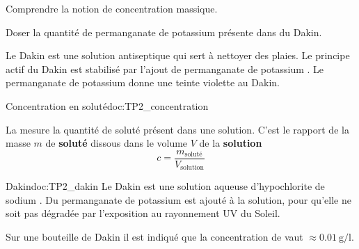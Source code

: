 \teteSndSolu


\vspace*{-36pt}


\begin{objectifs}
  \item Comprendre la notion de concentration massique.
  \item Doser la quantité de permanganate de potassium présente dans du Dakin.
\end{objectifs}


\begin{contexte}
  Le Dakin est une solution antiseptique qui sert à nettoyer des plaies. Le principe actif du Dakin est stabilisé par l'ajout de permanganate de potassium .
  Le permanganate de potassium donne une teinte violette au Dakin.
  
\end{contexte}


\begin{doc}{Concentration en soluté}{doc:TP2_concentration}
  \begin{encart}
    La  mesure la quantité de soluté présent dans une solution.
    C'est le rapport de la masse $m$ de \textbf{soluté} dissous dans le volume $V$ de la \textbf{solution}
    \begin{equation*}
      c = \frac{m_\text{soluté}}{V_\text{solution}}
    \end{equation*}
  \end{encart}
\end{doc}


\begin{doc}{Dakin}{doc:TP2_dakin}
  Le Dakin est une solution aqueuse d'hypochlorite de sodium .
  Du permanganate de potassium  est ajouté à la solution, pour qu'elle ne soit pas dégradée par l'exposition au rayonnement UV du Soleil.
  
  \fleche Sur une bouteille de Dakin il est indiqué que la concentration de  vaut $\approx \qty{0,01}{\g/\litre}$.
\end{doc}

%



